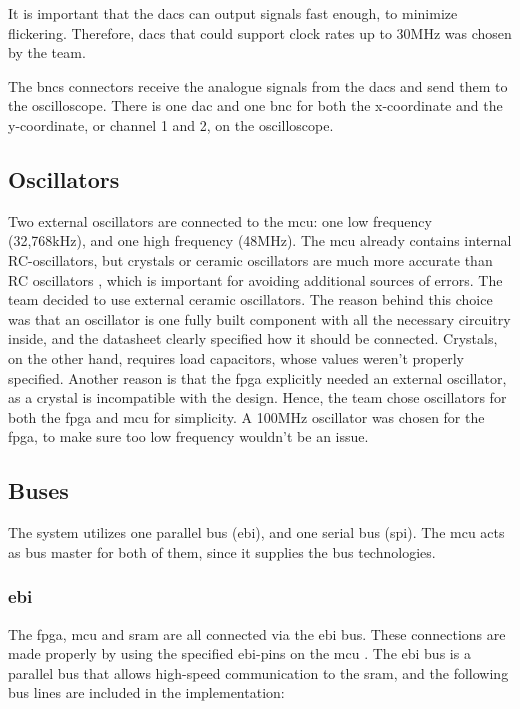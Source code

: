 It is important that the \gls{dac}s can output signals fast enough, to minimize flickering.
Therefore, \gls{dac}s that could support clock rates up to 30MHz was chosen by the team.

The \gls{bnc}s connectors receive the analogue signals from the \gls{dac}s and send them to the oscilloscope.
There is one \gls{dac} and one \gls{bnc} for both the x-coordinate and the y-coordinate, or channel 1 and 2, on the oscilloscope.

\subsection{Oscillators}
Two external oscillators are connected to the \gls{mcu}: one low frequency (32,768kHz), and one high frequency (48MHz).
The \gls{mcu} already contains internal RC-oscillators, but crystals or ceramic oscillators are much more accurate than RC oscillators \cite{oscillators}, which is important for avoiding additional sources of errors.
The team decided to use external ceramic oscillators.
The reason behind this choice was that an oscillator is one fully built component with all the necessary circuitry inside, and the datasheet clearly specified how it should be connected.
Crystals, on the other hand, requires load capacitors, whose values weren't properly specified.
Another reason is that the \gls{fpga} explicitly needed an external oscillator, as a crystal is incompatible with the design.
Hence, the team chose oscillators for both the \gls{fpga} and \gls{mcu} for simplicity.
A 100MHz oscillator was chosen for the \gls{fpga}, to make sure too low frequency wouldn't be an issue.

\subsection{Buses}
The system utilizes one parallel bus (\gls{ebi}), and one serial bus (\gls{spi}).
The \gls{mcu} acts as bus master for both of them, since it supplies the bus technologies.

\subsubsection{\gls{ebi}}
The \gls{fpga}, \gls{mcu} and \gls{sram} are all connected via the \gls{ebi} bus.
These connections are made properly by using the specified \gls{ebi}-pins on the \gls{mcu} \cite[sec. 4.1]{efm32-datasheet}.
The \gls{ebi} bus is a parallel bus that allows high-speed communication to the \gls{sram}, and the following bus lines are included in the implementation:


